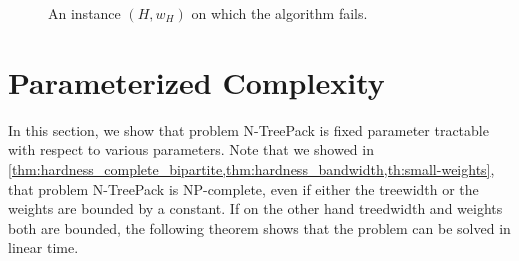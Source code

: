 \documentclass[runningheads]{llncs}
\newcommand{\xxxNTP}{{\sc N-TreePack}}
\newcommand{\greedy}{\text{\sf Greedy}}
\begin{document}
\begin{figure}[tbh]
\bigskip
\begin{center}
\end{center}
\caption{An instance $(H,w_H)$ on which the {\greedy} algorithm fails.}
\label{fig:cactus}
\end{figure}



\section{Parameterized Complexity}
\label{sec:parameterized}
In this section, we show that problem {\xxxNTP} is fixed parameter tractable with 
respect to various parameters. 
Note that we showed in \cref{thm:hardness_complete_bipartite,thm:hardness_bandwidth,th:small-weights}, 
that problem {\xxxNTP} is NP-complete, even if either the treewidth or the weights are bounded by a constant. 
If on the other hand treedwidth and weights both are bounded, the following theorem shows that 
the problem can be solved in linear time.
\end{document}
